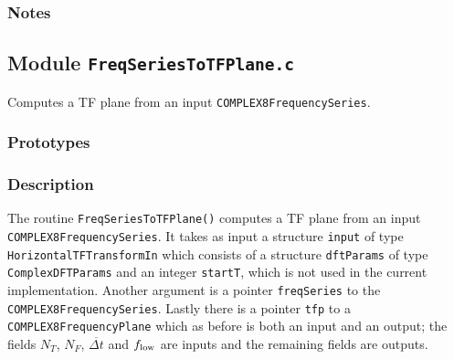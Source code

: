 \subsubsection*{Notes}

\vfill{\footnotesize}

\newpage
\subsection{Module \texttt{FreqSeriesToTFPlane.c}}
\label{ss:FreqSeriesToTFPlane.c}

Computes a TF plane from an input \verb+COMPLEX8FrequencySeries+.

\subsubsection*{Prototypes}
\vspace{0.1in}


\subsubsection*{Description}

The routine \verb+FreqSeriesToTFPlane()+ computes a TF plane from an input
\verb+COMPLEX8FrequencySeries+.  It takes as input a structure \verb+input+ of
type \verb+HorizontalTFTransformIn+ which consists of a structure
\verb+dftParams+ of type \verb+ComplexDFTParams+ and an integer \verb+startT+,
which is not used in the current implementation.  Another argument is a
pointer \verb+freqSeries+ to the \verb+COMPLEX8FrequencySeries+.  Lastly there
is a pointer \verb+tfp+ to a \verb+COMPLEX8FrequencyPlane+ which as before is
both an input and an output; the fields $N_T$, $N_F$, ${\overline {\Delta t}}$
and $f_{\rm low}$ are inputs and the remaining fields are outputs.


